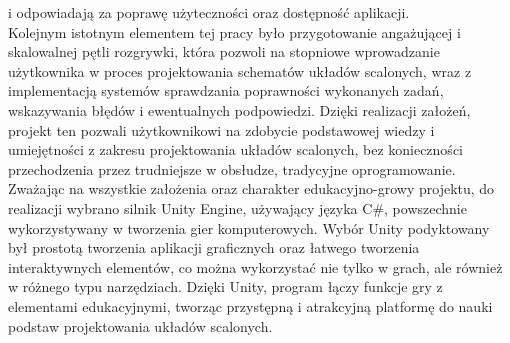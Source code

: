 i odpowiadają za poprawę użyteczności oraz dostępność aplikacji.\\
\indent Kolejnym istotnym elementem tej pracy było przygotowanie angażującej i skalowalnej pętli rozgrywki,
która pozwoli na stopniowe wprowadzanie użytkownika w proces projektowania schematów układów scalonych,
wraz z implementacją systemów sprawdzania poprawności wykonanych zadań, wskazywania błędów i ewentualnych podpowiedzi.
Dzięki realizacji założeń, projekt ten pozwali użytkownikowi na zdobycie podstawowej wiedzy
i umiejętności z zakresu projektowania układów scalonych,
bez konieczności przechodzenia przez trudniejsze w obsłudze, tradycyjne oprogramowanie.\\
\indent Zważając na wszystkie założenia oraz charakter edukacyjno-growy projektu,
do realizacji wybrano silnik Unity Engine,
używający języka C\#,
powszechnie wykorzystywany w tworzenia gier komputerowych.
Wybór Unity podyktowany był prostotą tworzenia aplikacji graficznych oraz łatwego tworzenia interaktywnych elementów,
co można wykorzystać nie tylko w grach, ale również w różnego typu narzędziach.
Dzięki Unity,
program łączy funkcje gry z elementami edukacyjnymi,
tworząc przystępną i atrakcyjną platformę do nauki podstaw projektowania układów scalonych.
